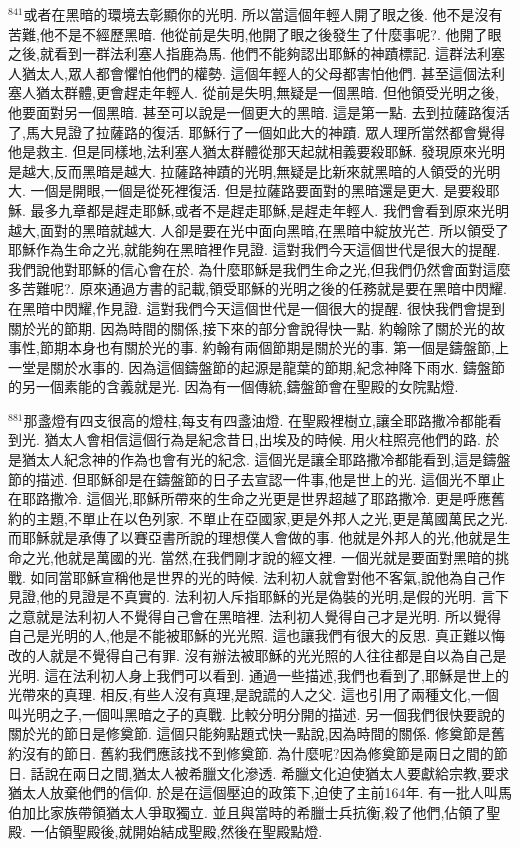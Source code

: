 \documentclass{book}
\begin{document}
$^{841}$或者在黑暗的環境去彰顯你的光明.
所以當這個年輕人開了眼之後.
他不是沒有苦難,他不是不經歷黑暗.
他從前是失明,他開了眼之後發生了什麼事呢?.
他開了眼之後,就看到一群法利塞人指鹿為馬.
他們不能夠認出耶穌的神蹟標記.
這群法利塞人猶太人,眾人都會懼怕他們的權勢.
這個年輕人的父母都害怕他們.
甚至這個法利塞人猶太群體,更會趕走年輕人.
從前是失明,無疑是一個黑暗.
但他領受光明之後,他要面對另一個黑暗.
甚至可以說是一個更大的黑暗.
這是第一點.
去到拉薩路復活了,馬大見證了拉薩路的復活.
耶穌行了一個如此大的神蹟.
眾人理所當然都會覺得他是救主.
但是同樣地,法利塞人猶太群體從那天起就相義要殺耶穌.
發現原來光明是越大,反而黑暗是越大.
拉薩路神蹟的光明,無疑是比新來就黑暗的人領受的光明大.
一個是開眼,一個是從死裡復活.
但是拉薩路要面對的黑暗還是更大.
是要殺耶穌.
最多九章都是趕走耶穌,或者不是趕走耶穌,是趕走年輕人.
我們會看到原來光明越大,面對的黑暗就越大.
人卻是要在光中面向黑暗,在黑暗中綻放光芒.
所以領受了耶穌作為生命之光,就能夠在黑暗裡作見證.
這對我們今天這個世代是很大的提醒.
我們說他對耶穌的信心會在於.
為什麼耶穌是我們生命之光,但我們仍然會面對這麼多苦難呢?.
原來通過方書的記載,領受耶穌的光明之後的任務就是要在黑暗中閃耀.
在黑暗中閃耀,作見證.
這對我們今天這個世代是一個很大的提醒.
很快我們會提到關於光的節期.
因為時間的關係,接下來的部分會說得快一點.
約翰除了關於光的故事性,節期本身也有關於光的事.
約翰有兩個節期是關於光的事.
第一個是鑄盤節,上一堂是關於水事的.
因為這個鑄盤節的起源是龍葉的節期,紀念神降下雨水.
鑄盤節的另一個素能的含義就是光.
因為有一個傳統,鑄盤節會在聖殿的女院點燈.

$^{881}$那盞燈有四支很高的燈柱,每支有四盞油燈.
在聖殿裡樹立,讓全耶路撒冷都能看到光.
猶太人會相信這個行為是紀念昔日,出埃及的時候.
用火柱照亮他們的路.
於是猶太人紀念神的作為也會有光的紀念.
這個光是讓全耶路撒冷都能看到,這是鑄盤節的描述.
但耶穌卻是在鑄盤節的日子去宣認一件事,他是世上的光.
這個光不單止在耶路撒冷.
這個光,耶穌所帶來的生命之光更是世界超越了耶路撒冷.
更是呼應舊約的主題,不單止在以色列家.
不單止在亞國家,更是外邦人之光,更是萬國萬民之光.
而耶穌就是承傳了以賽亞書所說的理想僕人會做的事.
他就是外邦人的光,他就是生命之光,他就是萬國的光.
當然,在我們剛才說的經文裡.
一個光就是要面對黑暗的挑戰.
如同當耶穌宣稱他是世界的光的時候.
法利初人就會對他不客氣,說他為自己作見證,他的見證是不真實的.
法利初人斥指耶穌的光是偽裝的光明,是假的光明.
言下之意就是法利初人不覺得自己會在黑暗裡.
法利初人覺得自己才是光明.
所以覺得自己是光明的人,他是不能被耶穌的光光照.
這也讓我們有很大的反思.
真正難以悔改的人就是不覺得自己有罪.
沒有辦法被耶穌的光光照的人往往都是自以為自己是光明.
這在法利初人身上我們可以看到.
通過一些描述,我們也看到了,耶穌是世上的光帶來的真理.
相反,有些人沒有真理,是說謊的人之父.
這也引用了兩種文化,一個叫光明之子,一個叫黑暗之子的真戰.
比較分明分開的描述.
另一個我們很快要說的關於光的節日是修奠節.
這個只能夠點題式快一點說,因為時間的關係.
修奠節是舊約沒有的節日.
舊約我們應該找不到修奠節.
為什麼呢?因為修奠節是兩日之間的節日.
話說在兩日之間,猶太人被希臘文化滲透.
希臘文化迫使猶太人要獻給宗教,要求猶太人放棄他們的信仰.
於是在這個壓迫的政策下,迫使了主前164年.
有一批人叫馬伯加比家族帶領猶太人爭取獨立.
並且與當時的希臘士兵抗衡,殺了他們,佔領了聖殿.
一佔領聖殿後,就開始結成聖殿,然後在聖殿點燈.
\end{document}
